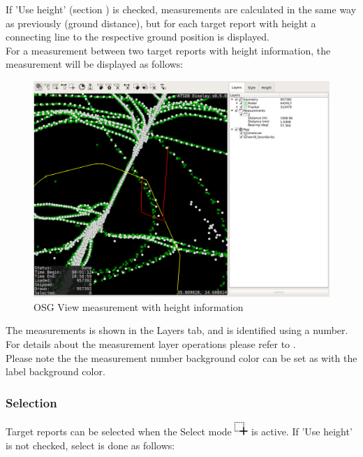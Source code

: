 If 'Use height' (section ) is checked, measurements are calculated in the same way as previously (ground distance), but for each target report with height a connecting line to the respective ground position is displayed. \\

For a measurement between two target reports with height information, the measurement will be displayed as follows:

\begin{figure}[H]
    \hspace*{-2.5cm}
    \includegraphics[width=19cm,frame]{figures/osgview_measure3d.png}
  \caption{OSG View measurement with height information}
\end{figure}

The measurements is shown in the Layers tab, and is identified using a number. For details about the measurement layer operations please refer to . \\

Please note the the measurement number background color can be set as with the label background color. 

\subsubsection{Selection}
\label{sec:osgview_selection}

Target reports can be selected when the Select mode \includegraphics[width=0.5cm,frame]{../../data/icons/select_action.png} is active. If 'Use height' is not checked, select is done as follows:

